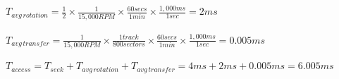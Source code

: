 \documentclass{article}
\begin{document}
$T_{avg\,rotation} = \frac{1}{2} \times \frac{1}{15,000RPM} \times 
\frac{60secs}{1min} \times \frac{1,000ms}{1sec} = 2ms$ \\
\\
$T_{avg\,transfer} = \frac{1}{15,000RPM} \times \frac{1track}{800sectors} \times
\frac{60secs}{1min} \times \frac{1,000ms}{1sec} = 0.005ms$ \\
\\
$T_{access} = T_{seek} + T_{avg\,rotation} + T_{avg\,transfer} = 
4ms + 2ms + 0.005ms = 6.005ms$
\end{document}
